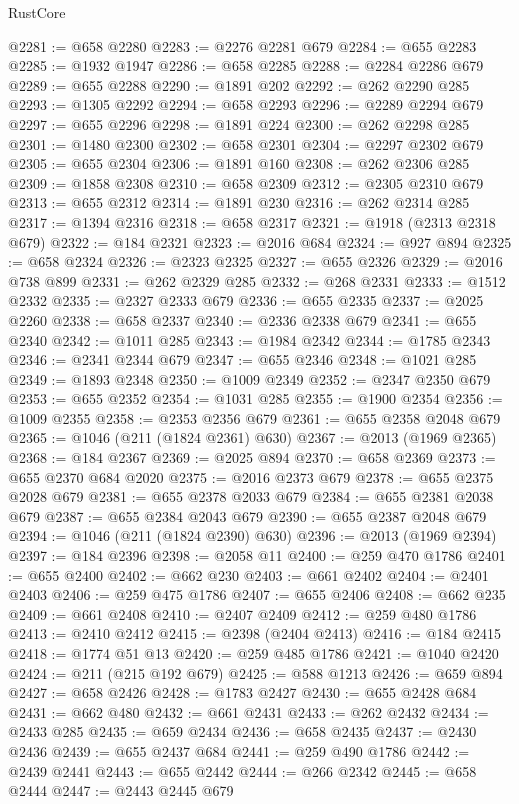 \begin{lexlean}{RustCore}
\begin{coremodule}
@2281 := @658 @2280
@2283 := @2276 @2281 @679
@2284 := @655 @2283
@2285 := @1932 @1947
@2286 := @658 @2285
@2288 := @2284 @2286 @679
@2289 := @655 @2288
@2290 := @1891 @202
@2292 := @262 @2290 @285
@2293 := @1305 @2292
@2294 := @658 @2293
@2296 := @2289 @2294 @679
@2297 := @655 @2296
@2298 := @1891 @224
@2300 := @262 @2298 @285
@2301 := @1480 @2300
@2302 := @658 @2301
@2304 := @2297 @2302 @679
@2305 := @655 @2304
@2306 := @1891 @160
@2308 := @262 @2306 @285
@2309 := @1858 @2308
@2310 := @658 @2309
@2312 := @2305 @2310 @679
@2313 := @655 @2312
@2314 := @1891 @230
@2316 := @262 @2314 @285
@2317 := @1394 @2316
@2318 := @658 @2317
@2321 := @1918 (@2313 @2318 @679)
@2322 := @184 @2321
@2323 := @2016 @684
@2324 := @927 @894
@2325 := @658 @2324
@2326 := @2323 @2325
@2327 := @655 @2326
@2329 := @2016 @738 @899
@2331 := @262 @2329 @285
@2332 := @268 @2331
@2333 := @1512 @2332
@2335 := @2327 @2333 @679
@2336 := @655 @2335
@2337 := @2025 @2260
@2338 := @658 @2337
@2340 := @2336 @2338 @679
@2341 := @655 @2340
@2342 := @1011 @285
@2343 := @1984 @2342
@2344 := @1785 @2343
@2346 := @2341 @2344 @679
@2347 := @655 @2346
@2348 := @1021 @285
@2349 := @1893 @2348
@2350 := @1009 @2349
@2352 := @2347 @2350 @679
@2353 := @655 @2352
@2354 := @1031 @285
@2355 := @1900 @2354
@2356 := @1009 @2355
@2358 := @2353 @2356 @679
@2361 := @655 @2358 @2048 @679
@2365 := @1046 (@211 (@1824 @2361) @630)
@2367 := @2013 (@1969 @2365)
@2368 := @184 @2367
@2369 := @2025 @894
@2370 := @658 @2369
@2373 := @655 @2370 @684 @2020
@2375 := @2016 @2373 @679
@2378 := @655 @2375 @2028 @679
@2381 := @655 @2378 @2033 @679
@2384 := @655 @2381 @2038 @679
@2387 := @655 @2384 @2043 @679
@2390 := @655 @2387 @2048 @679
@2394 := @1046 (@211 (@1824 @2390) @630)
@2396 := @2013 (@1969 @2394)
@2397 := @184 @2396
@2398 := @2058 @11
@2400 := @259 @470 @1786
@2401 := @655 @2400
@2402 := @662 @230
@2403 := @661 @2402
@2404 := @2401 @2403
@2406 := @259 @475 @1786
@2407 := @655 @2406
@2408 := @662 @235
@2409 := @661 @2408
@2410 := @2407 @2409
@2412 := @259 @480 @1786
@2413 := @2410 @2412
@2415 := @2398 (@2404 @2413)
@2416 := @184 @2415
@2418 := @1774 @51 @13
@2420 := @259 @485 @1786
@2421 := @1040 @2420
@2424 := @211 (@215 @192 @679)
@2425 := @588 @1213
@2426 := @659 @894
@2427 := @658 @2426
@2428 := @1783 @2427
@2430 := @655 @2428 @684
@2431 := @662 @480
@2432 := @661 @2431
@2433 := @262 @2432
@2434 := @2433 @285
@2435 := @659 @2434
@2436 := @658 @2435
@2437 := @2430 @2436
@2439 := @655 @2437 @684
@2441 := @259 @490 @1786
@2442 := @2439 @2441
@2443 := @655 @2442
@2444 := @266 @2342
@2445 := @658 @2444
@2447 := @2443 @2445 @679

\end{coremodule}
\end{lexlean}
